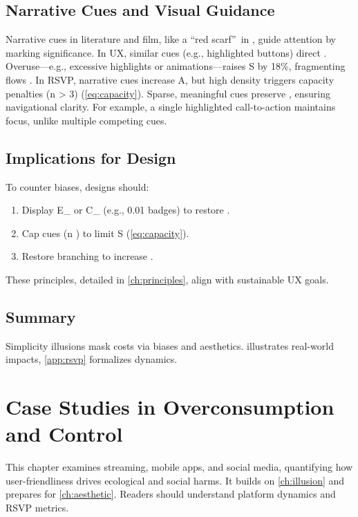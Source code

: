 \documentclass[openany]{book}
\newcommand{\PhiS}{\Phi} %
\newcommand{\vvec}{\mathbf{v}} %
\newcommand{\Sent}{S} %
\newcommand{\Eint}{E_{\mathrm{int}}} %
\newcommand{\Cfoot}{C_{\mathrm{foot}}} %
\newcommand{\Auton}{\mathcal{A}} %
\newcommand{\kWh}{\mathrm{kWh}}
\begin{document}
\section{Narrative Cues and Visual Guidance}
\label{sec:narrative}
Narrative cues in literature and film, like a \textquotedblleft red scarf\textquotedblright\ in \citet{lewis1942}, guide attention by marking significance. In UX, similar cues (e.g., highlighted buttons) direct \vvec{}. Overuse---e.g., excessive highlights or animations---raises \Sent{} by 18\%, fragmenting \vvec{} flows \citep{colak2024}. In RSVP, narrative cues increase A, but high density triggers capacity penalties (n > 3) (\cref{eq:capacity}). Sparse, meaningful cues preserve \PhiS{}, ensuring navigational clarity. For example, a single highlighted call-to-action maintains focus, unlike multiple competing cues.

\section{Implications for Design}
\label{sec:illusion-implications}
To counter biases, designs should:
\begin{enumerate}
  \item Display \Eint{} or \Cfoot{} (e.g., \SI{0.01}{\kWh} badges) to restore \PhiS{}.
  \item Cap cues (n ) to limit \Sent{} (\cref{eq:capacity}).
  \item Restore branching to increase \Auton{} \citep{doctorow2022}.
\end{enumerate}
These principles, detailed in \cref{ch:principles}, align with sustainable UX goals.

\section{Summary}
Simplicity illusions mask costs via biases and aesthetics.  illustrates real-world impacts, \cref{app:rsvp} formalizes dynamics.

\chapter{Case Studies in Overconsumption and Control}
\label{ch:cases}

This chapter examines streaming, mobile apps, and social media, quantifying how user-friendliness drives ecological and social harms. It builds on \cref{ch:illusion} and prepares for \cref{ch:aesthetic}. Readers should understand platform dynamics and RSVP metrics.
\end{document}
